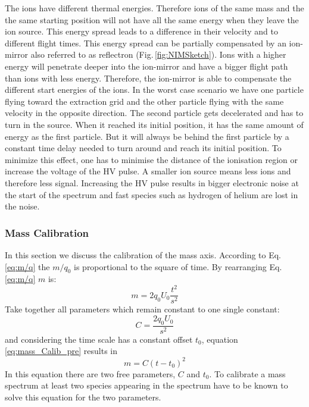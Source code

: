 	The ions have different thermal energies. Therefore ions of the same mass and the the same starting position will not have all the same energy when they leave the ion source. This energy spread leads to a difference in their velocity and to different flight times. This energy spread can be partially compensated by an ion-mirror also referred to as reflectron (Fig.\,\ref{fig:NIMSketch}). Ions with a higher energy will penetrate deeper into the ion-mirror and have a bigger flight path than ions with less energy. Therefore, the ion-mirror is able to compensate the different start energies of the ions. In the worst case scenario we have one particle flying toward the extraction grid and the other particle flying with the same velocity in the opposite direction. The second particle gets decelerated and has to turn in the source. When it reached its initial position, it has the same amount of energy as the first particle. But it will always be behind the first particle by a constant time delay needed to turn around and reach its initial position. To minimize this effect, one has to minimise the distance of the ionisation region or increase the voltage of the HV pulse. A smaller ion source means less ions and therefore less signal. Increasing the HV pulse results in bigger electronic noise at the start of the spectrum and fast species such as hydrogen of helium are lost in the noise. %

	\subsubsection{Mass Calibration}
	In this section we discuss the calibration of the mass axis. According to Eq.\,\eqref{eq:m/q} the $m/q_0$ is proportional to the square of time. By rearranging Eq.\,\eqref{eq:m/q} $m$ is:
	\begin{equation}
		m = 2 q_0 U_0 \frac{t^2}{s^2}
		\label{eq:mass_Calib_pre}
	\end{equation}
	Take together all parameters which remain constant to one single constant: %
	\begin{equation}
		C = \frac{2 q_0 U_0 }{s^2} 
	\end{equation}
	and considering the time scale has a constant offset $t_0$, equation \eqref{eq:mass_Calib_pre} results in %
	\begin{equation}
		m = C(t-t_0)^2
		\label{eq:mass_Calib}
	\end{equation}
	In this equation there are two free parameters, $C$ and $t_0$. To calibrate a mass spectrum at least two species appearing in the spectrum have to be known to solve this equation for the two parameters.
	
